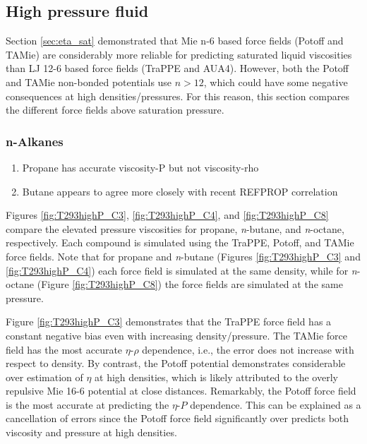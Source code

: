\documentclass[preprint,review,12pt]{elsarticle}
\begin{document}
\subsection{High pressure fluid} \label{sec:T293highP}

Section \ref{sec:eta_sat} demonstrated that Mie n-6 based force fields (Potoff and TAMie) are considerably more reliable for predicting saturated liquid viscosities than LJ 12-6 based force fields (TraPPE and AUA4). However, both the Potoff and TAMie non-bonded potentials use $n > 12$, which could have some negative consequences at high densities/pressures. For this reason, this section compares the different force fields above saturation pressure.

\subsubsection{n-Alkanes}

\begin{enumerate}
	\item Propane has accurate viscosity-P but not viscosity-rho
	\item Butane appears to agree more closely with recent REFPROP correlation
\end{enumerate}

%

Figures \ref{fig:T293highP_C3}, \ref{fig:T293highP_C4}, and \ref{fig:T293highP_C8} compare the elevated pressure viscosities for propane, \textit{n}-butane, and \textit{n}-octane, respectively. Each compound is simulated using the TraPPE, Potoff, and TAMie force fields. Note that for propane and \textit{n}-butane (Figures \ref{fig:T293highP_C3} and \ref{fig:T293highP_C4}) each force field is simulated at the same density, while for \textit{n}-octane (Figure \ref{fig:T293highP_C8}) the force fields are simulated at the same pressure. 


Figure \ref{fig:T293highP_C3} demonstrates that the TraPPE force field has a constant negative bias even with increasing density/pressure. The TAMie force field has the most accurate $\eta$-$\rho$ dependence, i.e., the error does not increase with respect to density. By contrast, the Potoff potential demonstrates considerable over estimation of $\eta$ at high densities, which is likely attributed to the overly repulsive Mie 16-6 potential at close distances. Remarkably, the Potoff force field is the most accurate at predicting the $\eta$-$P$ dependence. This can be explained as a cancellation of errors since the Potoff force field significantly over predicts both viscosity and pressure at high densities. 
\end{document}

